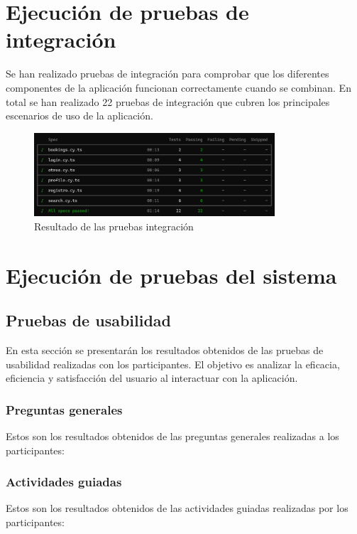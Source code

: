 \section{Ejecución de pruebas de integración}
Se han realizado pruebas de integración para comprobar que los diferentes componentes de la aplicación funcionan correctamente cuando se combinan.
En total se han realizado 22 pruebas de integración que cubren los principales escenarios de uso de la aplicación.
\begin{figure}[H]
	\centering
	\includegraphics[width=0.8\textwidth]{7-Construccion/Pruebas/integracion.png}
	\caption{Resultado de las pruebas integración}
\end{figure}
\section{Ejecución de pruebas del sistema}
\subsection{Pruebas de usabilidad}
En esta sección se presentarán los resultados obtenidos de las pruebas de usabilidad realizadas con los participantes. El objetivo es analizar la eficacia, eficiencia y satisfacción del usuario al interactuar con la aplicación.
\subsubsection{Preguntas generales}
Estos son los resultados obtenidos de las preguntas generales realizadas a los participantes:

\subsubsection{Actividades guiadas}
Estos son los resultados obtenidos de las actividades guiadas realizadas por los participantes:

